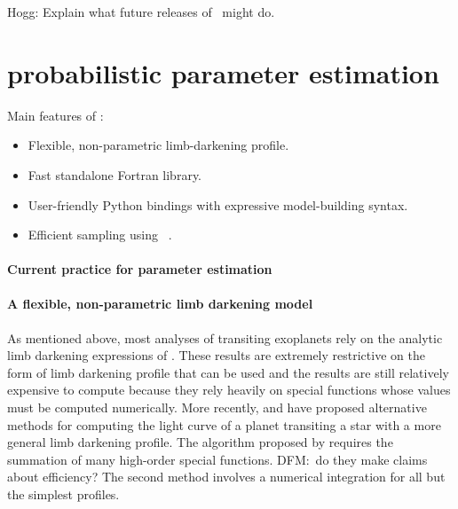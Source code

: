 \documentclass[letterpaper,12pt,preprint]{hack_aastex}
\newcommand{\Turnstile}{\package{IronHorse}}
\newcommand{\Bart}{\package{Bart}}
\newcommand{\emcee}{\package{emcee}}
\begin{document}
Hogg:  Explain what future releases of \Turnstile\ might do.


\section{probabilistic parameter estimation}

Main features of \Bart:
\begin{itemize}
\item Flexible, non-parametric limb-darkening profile.
\item Fast standalone Fortran library.
\item User-friendly Python bindings with expressive model-building syntax.
\item Efficient sampling using \emcee\ \citep{emcee}.
\end{itemize}

\paragraph{Current practice for parameter estimation}
\citet{mandel}

\paragraph{A flexible, non-parametric limb darkening model}
As mentioned above, most analyses of transiting exoplanets rely on the
analytic limb darkening expressions of \citet{mandel}.
These results are extremely restrictive on the form of limb darkening profile
that can be used and the results are still relatively expensive to compute
because they rely heavily on special functions whose values must be computed
numerically.
More recently, \citet{crazyass1} and \citet{crazyass2} have proposed
alternative methods for computing the light curve of a planet transiting a
star with a more general limb darkening profile.
The algorithm proposed by \citet{crazyass1} requires the summation of many
high-order special functions.
DFM:\ do they make claims about efficiency?
The second method \citep{crazyass2} involves a numerical integration for
all but the simplest profiles.
\end{document}
